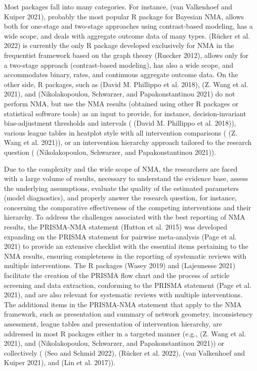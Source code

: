 Most packages fall into many categories. For instance, 
(van Valkenhoef and Kuiper 2021), probably the most popular R package for Bayesian NMA, allows both for
one-stage and two-stage approaches using contrast-based modeling, has a wide scope,
and deals with aggregate outcome data of many types.  (Rücker et al. 2022)
is currently the only R package developed exclusively for NMA in the frequentist
framework based on the graph theory (Ruecker 2012), allows only for a two-stage
approach (contrast-based modeling), has also a wide scope, and accommodates
binary, rates, and continuous aggregate outcome data. On the other side, R packages,
such as  (David M. Phillippo et al. 2018),  (Z. Wang et al. 2021),
and  (Nikolakopoulou, Schwarzer, and Papakonstantinou 2021) do not perform NMA, but use the NMA results (obtained
using other R packages or statistical software tools) as an input to provide, for
instance, decision-invariant bias-adjustment thresholds and intervals (
(David M. Phillippo et al. 2018)), various league tables in heatplot style with all intervention
comparisons ( (Z. Wang et al. 2021)), or an intervention hierarchy
approach tailored to the research question ( (Nikolakopoulou, Schwarzer, and Papakonstantinou 2021)).

Due to the complexity and the wide scope of NMA, the researchers are faced with
a large volume of results, necessary to understand the evidence base, assess the
underlying assumptions, evaluate the quality of the estimated parameters (model
diagnostics), and properly answer the research question, for instance, concerning
the comparative effectiveness of the competing interventions and their hierarchy.
To address the challenges associated with the best reporting of NMA results, the
PRISMA-NMA statement (Hutton et al. 2015) was developed expanding on the PRISMA statement
for pairwise meta-analysis (Page et al. 2021) to provide an extensive checklist with the
essential items pertaining to the NMA results, ensuring completeness in the reporting
of systematic reviews with multiple interventions. The R packages
 (Wasey 2019) and  (Lajeunesse 2021)
facilitate the creation of the PRISMA flow chart and the process of article screening
and data extraction, conforming to the PRISMA statement (Page et al. 2021), and are also
relevant for systematic reviews with multiple interventions. The additional items
in the PRISMA-NMA statement that apply to the NMA framework, such as presentation
and summary of network geometry, inconsistency assessment, league tables and
presentation of intervention hierarchy, are addressed in most R packages either
in a targeted manner (e.g.,  (Z. Wang et al. 2021), and
 (Nikolakopoulou, Schwarzer, and Papakonstantinou 2021)) or collectively ( (Seo and Schmid 2022),
 (Rücker et al. 2022),  (van Valkenhoef and Kuiper 2021), and 
(Lin et al. 2017)).

